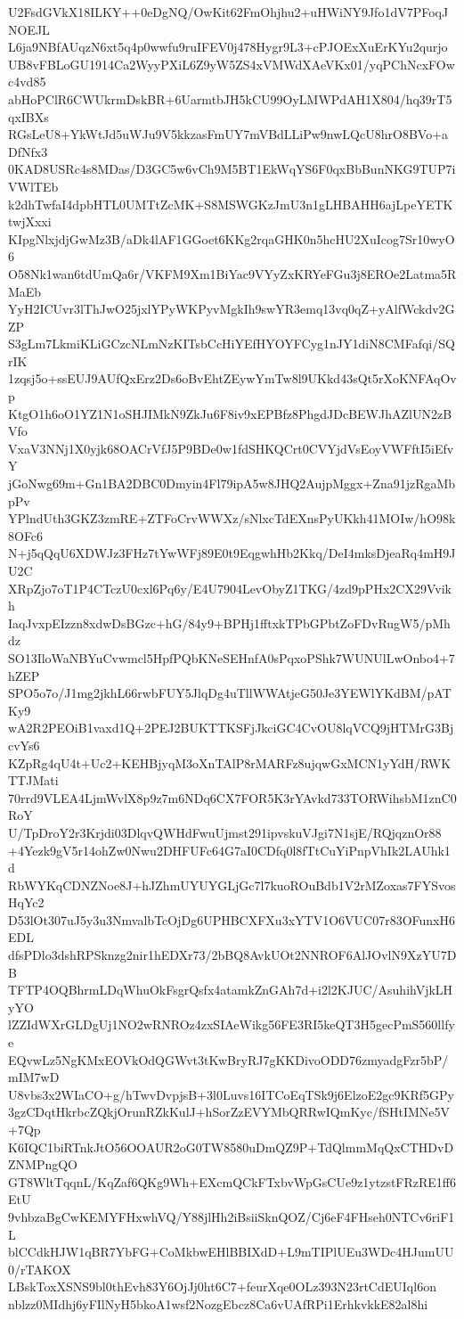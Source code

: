 U2FsdGVkX18ILKY++0eDgNQ/OwKit62FmOhjhu2+uHWiNY9Jfo1dV7PFoqJNOEJL
L6ja9NBfAUqzN6xt5q4p0wwfu9ruIFEV0j478Hygr9L3+cPJOExXuErKYu2qurjo
UB8vFBLoGU1914Ca2WyyPXiL6Z9yW5ZS4xVMWdXAeVKx01/yqPChNcxFOwc4vd85
abHoPClR6CWUkrmDskBR+6UarmtbJH5kCU99OyLMWPdAH1X804/hq39rT5qxIBXs
RGsLeU8+YkWtJd5uWJu9V5kkzasFmUY7mVBdLLiPw9nwLQcU8hrO8BVo+aDfNfx3
0KAD8USRc4s8MDas/D3GC5w6vCh9M5BT1EkWqYS6F0qxBbBunNKG9TUP7iVWlTEb
k2dhTwfaI4dpbHTL0UMTtZcMK+S8MSWGKzJmU3n1gLHBAHH6ajLpeYETKtwjXxxi
KIpgNlxjdjGwMz3B/aDk4lAF1GGoet6KKg2rqaGHK0n5hcHU2XuIcog7Sr10wyO6
O58Nk1wan6tdUmQa6r/VKFM9Xm1BiYac9VYyZxKRYeFGu3j8EROe2Latma5RMaEb
YyH2ICUvr3lThJwO25jxlYPyWKPyvMgkIh9swYR3emq13vq0qZ+yAlfWckdv2GZP
S3gLm7LkmiKLiGCzcNLmNzKITsbCcHiYEfHYOYFCyg1nJY1diN8CMFafqi/SQrIK
1zqsj5o+ssEUJ9AUfQxErz2Ds6oBvEhtZEywYmTw8l9UKkd43sQt5rXoKNFAqOvp
KtgO1h6oO1YZ1N1oSHJIMkN9ZkJu6F8iv9xEPBfz8PhgdJDcBEWJhAZlUN2zBVfo
VxaV3NNj1X0yjk68OACrVfJ5P9BDe0w1fdSHKQCrt0CVYjdVsEoyVWFftI5iEfvY
jGoNwg69m+Gn1BA2DBC0Dmyin4Fl79ipA5w8JHQ2AujpMggx+Zna91jzRgaMbpPv
YPlndUth3GKZ3zmRE+ZTFoCrvWWXz/sNlxcTdEXnsPyUKkh41MOIw/hO98k8OFc6
N+j5qQqU6XDWJz3FHz7tYwWFj89E0t9EqgwhHb2Kkq/DeI4mksDjeaRq4mH9JU2C
XRpZjo7oT1P4CTczU0cxl6Pq6y/E4U7904LevObyZ1TKG/4zd9pPHx2CX29Vvikh
IaqJvxpEIzzn8xdwDsBGzc+hG/84y9+BPHj1fftxkTPbGPbtZoFDvRugW5/pMhdz
SO13IloWaNBYuCvwmcl5HpfPQbKNeSEHnfA0sPqxoPShk7WUNUlLwOnbo4+7hZEP
SPO5o7o/J1mg2jkhL66rwbFUY5JlqDg4uTllWWAtjeG50Je3YEWlYKdBM/pATKy9
wA2R2PEOiB1vaxd1Q+2PEJ2BUKTTKSFjJkciGC4CvOU8lqVCQ9jHTMrG3BjcvYs6
KZpRg4qU4t+Uc2+KEHBjyqM3oXnTAlP8rMARFz8ujqwGxMCN1yYdH/RWKTTJMati
70rrd9VLEA4LjmWvlX8p9z7m6NDq6CX7FOR5K3rYAvkd733TORWihsbM1znC0RoY
U/TpDroY2r3Krjdi03DlqvQWHdFwuUjmst291ipvskuVJgi7N1sjE/RQjqznOr88
+4Yezk9gV5r14ohZw0Nwu2DHFUFc64G7aI0CDfq0l8fTtCuYiPnpVhIk2LAUhk1d
RbWYKqCDNZNoe8J+hJZhmUYUYGLjGc7l7kuoROuBdb1V2rMZoxas7FYSvosHqYc2
D53lOt307uJ5y3u3NmvalbTcOjDg6UPHBCXFXu3xYTV1O6VUC07r83OFunxH6EDL
dfsPDlo3dshRPSknzg2nir1hEDXr73/2bBQ8AvkUOt2NNROF6AlJOvlN9XzYU7DB
TFTP4OQBhrmLDqWhuOkFsgrQsfx4atamkZnGAh7d+i2l2KJUC/AsuhihVjkLHyYO
lZZIdWXrGLDgUj1NO2wRNROz4zxSIAeWikg56FE3RI5keQT3H5gecPmS560llfye
EQvwLz5NgKMxEOVkOdQGWvt3tKwBryRJ7gKKDivoODD76zmyadgFzr5bP/mIM7wD
U8vbs3x2WIaCO+g/hTwvDvpjsB+3l0Luvs16ITCoEqTSk9j6ElzoE2gc9KRf5GPy
3gzCDqtHkrbcZQkjOrunRZkKulJ+hSorZzEVYMbQRRwIQmKyc/fSHtIMNe5V+7Qp
K6IQC1biRTnkJtO56OOAUR2oG0TW8580uDmQZ9P+TdQlmmMqQxCTHDvDZNMPngQO
GT8WltTqqnL/KqZaf6QKg9Wh+EXcmQCkFTxbvWpGsCUe9z1ytzstFRzRE1ff6EtU
9vhbzaBgCwKEMYFHxwhVQ/Y88jlHh2iBsiiSknQOZ/Cj6eF4FHseh0NTCv6riF1L
blCCdkHJW1qBR7YbFG+CoMkbwEHlBBIXdD+L9mTIPlUEu3WDc4HJumUU0/rTAKOX
LBskToxXSNS9bl0thEvh83Y6OjJj0ht6C7+feurXqe0OLz393N23rtCdEUIql6on
nblzz0MIdhj6yFIlNyH5bkoA1wsf2NozgEbcz8Ca6vUAfRPi1ErhkvkkE82al8hi
